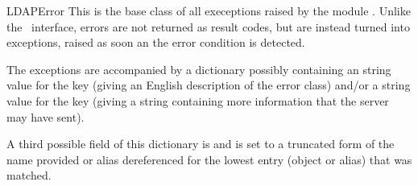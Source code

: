\begin{excdesc}{LDAPError}
This is the base class of all execeptions raised by the module .
Unlike the \C\ interface, errors are not returned as result codes, but
are instead turned into exceptions, raised as soon an the error condition 
is detected.

The exceptions are accompanied by a dictionary possibly
containing an string value for the key  
(giving an English description of the error class)
and/or a string value for the key 
(giving a string containing more information that the server may have sent).

A third possible field of this dictionary is  and
is set to a truncated form of the name provided or alias dereferenced
for the lowest entry (object or alias) that was matched.

\end{excdesc}

